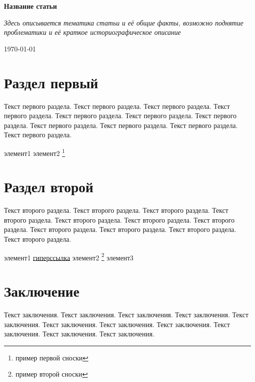 \documentclass[12pt]{article}			%
\begin{document}
\begin{center}
	\Huge{\textbf{Название статьи}}
\end{center}

\hfill

\noindent
\textit{Здесь описывается тематика статьи и её общие факты, возможно поднятие проблематики и её краткое историографическое описание}

\begin{flushright}
	\today
\end{flushright}
\hfill

	
\section{Раздел первый}
Текст первого раздела. Текст первого раздела. Текст первого раздела. Текст первого раздела. Текст первого раздела. Текст первого раздела. Текст первого раздела. Текст первого раздела. Текст первого раздела. Текст первого раздела. Текст первого раздела. 
\begin{outline}[itemize]
	\1 элемент1
	\1 элемент2 \footnote{пример первой сноски}
\end{outline}

\section{Раздел второй}
Текст второго раздела. Текст второго раздела. Текст второго раздела. Текст второго раздела. Текст второго раздела. Текст второго раздела. Текст второго раздела. Текст второго раздела. Текст второго раздела. Текст второго раздела. Текст второго раздела. 
\begin{outline}[enumerate]
	\1 элемент1 \href{https://www.google.com/}{гиперссылка}
	\1 элемент2 \footnote{пример второй сноски}
	\1 элемент3
\end{outline}

\section{Заключение}
Текст заключения. Текст заключения. Текст заключения. Текст заключения. Текст заключения. Текст заключения. Текст заключения. Текст заключения. Текст заключения. Текст заключения. Текст заключения. 
\end{document}
